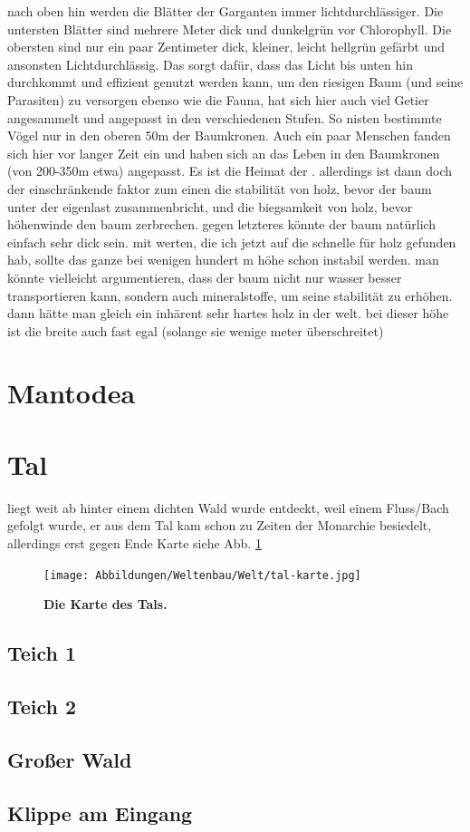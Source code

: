 \begin{outline}
	\1 nach oben hin werden die Blätter der Garganten immer lichtdurchlässiger. Die untersten Blätter sind mehrere Meter dick und dunkelgrün vor Chlorophyll. Die obersten sind nur ein paar Zentimeter dick, kleiner, leicht hellgrün gefärbt und ansonsten Lichtdurchlässig. Das sorgt dafür, dass das Licht bis unten hin durchkommt und effizient genutzt werden kann, um den riesigen Baum (und seine Parasiten) zu versorgen
	\1 ebenso wie die Fauna, hat sich hier auch viel Getier angesammelt und angepasst in den verschiedenen Stufen. So nisten bestimmte Vögel nur in den oberen 50m der Baumkronen. Auch ein paar Menschen fanden sich hier vor langer Zeit ein und haben sich an das Leben in den Baumkronen (von 200-350m etwa) angepasst. Es ist die Heimat der .
	\1 allerdings ist dann doch der einschränkende faktor zum einen die stabilität von holz, bevor der baum unter der eigenlast zusammenbricht, und die biegsamkeit von holz, bevor höhenwinde den baum zerbrechen. gegen letzteres könnte der baum natürlich einfach sehr dick sein. mit werten, die ich jetzt auf die schnelle für holz gefunden hab, sollte das ganze bei wenigen hundert m höhe schon instabil werden. man könnte vielleicht argumentieren, dass der baum nicht nur wasser besser transportieren kann, sondern auch mineralstoffe, um seine stabilität zu erhöhen. dann hätte man gleich ein inhärent sehr hartes holz in der welt. bei dieser höhe ist die breite auch fast egal (solange sie wenige meter überschreitet)
\end{outline}

\section{Mantodea} \label{sec:land}

\section{Tal}
\begin{outline}
	\1 liegt weit ab hinter einem dichten Wald
	\1 wurde entdeckt, weil einem Fluss/Bach gefolgt wurde, er aus dem Tal kam
	\1 schon zu Zeiten der Monarchie besiedelt, allerdings erst gegen Ende
	\1 Karte siehe Abb. \ref{fig:tal-karte}
\end{outline}

\begin{figure}[tbh]
	\centering
	\texttt{[image: Abbildungen/Weltenbau/Welt/tal-karte.jpg]}
	\caption[Karte des Tals]{\textbf{Die Karte des Tals.}}
	\label{fig:tal-karte}
\end{figure}

\subsection{Teich 1}
\subsection{Teich 2}
\subsection{Großer Wald}
\subsection{Klippe am Eingang}

